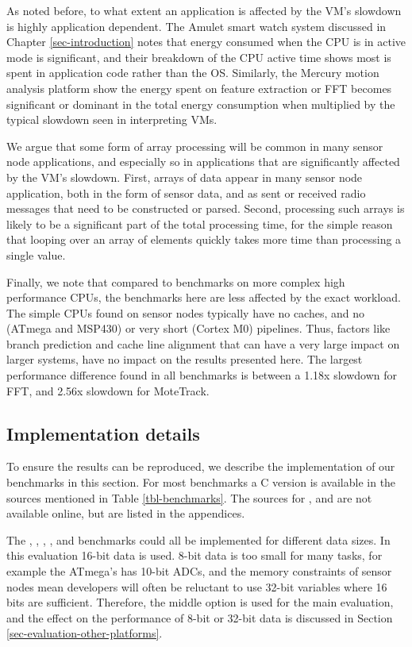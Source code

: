 


As noted before, to what extent an application is affected by the VM's slowdown is highly application dependent. The Amulet smart watch system discussed in Chapter \ref{sec-introduction} notes that energy consumed when the CPU is in active mode is significant, and their breakdown of the CPU active time shows most is spent in application code rather than the OS. Similarly, the Mercury motion analysis platform show the energy spent on feature extraction or FFT becomes significant or dominant in the total energy consumption when multiplied by the typical slowdown seen in interpreting VMs.

We argue that some form of array processing will be common in many sensor node applications, and especially so in applications that are significantly affected by the VM's slowdown. First, arrays of data appear in many sensor node application, both in the form of sensor data, and as sent or received radio messages that need to be constructed or parsed. Second, processing such arrays is likely to be a significant part of the total processing time, for the simple reason that looping over an array of elements quickly takes more time than processing a single value.

Finally, we note that compared to benchmarks on more complex high performance CPUs, the benchmarks here are less affected by the exact workload. The simple CPUs found on sensor nodes typically have no caches, and no (ATmega and MSP430) or very short (Cortex M0) pipelines. Thus, factors like branch prediction and cache line alignment that can have a very large impact on larger systems, have no impact on the results presented here. The largest performance difference found in all benchmarks is between a 1.18x slowdown for FFT, and 2.56x slowdown for MoteTrack.

\subsection{Implementation details}
To ensure the results can be reproduced, we describe the implementation of our benchmarks in this section. For most benchmarks a C version is available in the sources mentioned in Table \ref{tbl-benchmarks}. The sources for ,  and  are not available online, but are listed in the appendices.

The , , , , and  benchmarks could all be implemented for different data sizes. In this evaluation 16-bit data is used. 8-bit data is too small for many tasks, for example the ATmega's has 10-bit ADCs, and the memory constraints of sensor nodes mean developers will often be reluctant to use 32-bit variables where 16 bits are sufficient. Therefore, the middle option is used for the main evaluation, and the effect on the performance of 8-bit or 32-bit data is discussed in Section \ref{sec-evaluation-other-platforms}.

